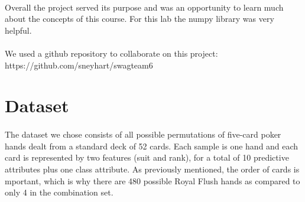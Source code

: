 \documentclass{article}
\begin{document}
\paragraph{} 
Overall the project served its purpose and was an opportunity to learn
much about the concepts of this course. For this lab the 
numpy library was very helpful.
\paragraph{} 
We used a github repository to collaborate on this project: https://github.com/sneyhart/swagteam6
\newpage


\section*{Dataset}
\paragraph{}
The dataset we chose consists of all possible permutations of five-card poker hands dealt
from a standard deck of 52 cards.  Each sample is one hand and each card is represented
by two features (suit and rank), for a total of 10 predictive attributes plus one class
attribute.  As previously mentioned, the order of cards is mportant, which is why there
are 480 possible Royal Flush hands as compared to only 4 in the combination set.
\end{document}
